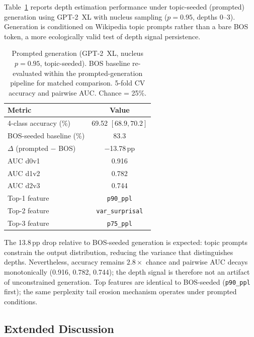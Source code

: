 Table~\ref{tab:prompted_gen} reports depth estimation performance under topic-seeded (prompted) generation using GPT-2~XL with nucleus sampling ($p{=}0.95$, depths 0--3).
Generation is conditioned on Wikipedia topic prompts rather than a bare BOS token, a more ecologically valid test of depth signal persistence.

\begin{table}[h]
\centering
\small
\caption{Prompted generation (GPT-2~XL, nucleus $p{=}0.95$, topic-seeded). BOS baseline re-evaluated within the prompted-generation pipeline for matched comparison. 5-fold CV accuracy and pairwise AUC. Chance = 25\%.}
\label{tab:prompted_gen}
\begin{tabular}{@{}lc@{}}
\toprule
Metric & Value \\
\midrule
4-class accuracy (\%) & 69.52 $[68.9, 70.2]$ \\
BOS-seeded baseline (\%) & 83.3 \\
$\Delta$ (prompted $-$ BOS) & $-$13.78\,pp \\
\midrule
AUC d0v1 & 0.916 \\
AUC d1v2 & 0.782 \\
AUC d2v3 & 0.744 \\
\midrule
Top-1 feature & \texttt{p90\_ppl} \\
Top-2 feature & \texttt{var\_surprisal} \\
Top-3 feature & \texttt{p75\_ppl} \\
\bottomrule
\end{tabular}
\end{table}

The 13.8\,pp drop relative to BOS-seeded generation is expected: topic prompts constrain the output distribution, reducing the variance that distinguishes depths.
Nevertheless, accuracy remains $2.8\times$ chance and pairwise AUC decays monotonically (0.916, 0.782, 0.744); the depth signal is therefore not an artifact of unconstrained generation.
Top features are identical to BOS-seeded (\texttt{p90\_ppl} first); the same perplexity tail erosion mechanism operates under prompted conditions.

\subsection{Extended Discussion}
\label{app:extended_discussion}

